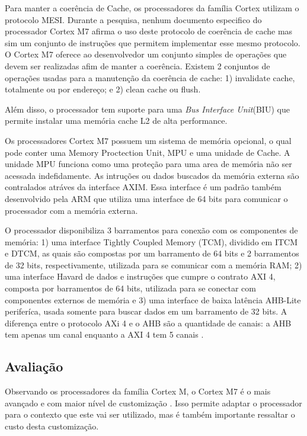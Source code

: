 \documentclass[10pt, a4paper]{article}
\begin{document}
Para manter a coerência de Cache, os processadores da família Cortex utilizam o protocolo MESI. Durante a pesquisa, nenhum documento especifico do processador Cortex M7 afirma o uso deste protocolo de coerência de cache mas sim um conjunto de instruções que permitem implementar esse mesmo protocolo. O Cortex M7 oferece ao desenvolvedor um conjunto simples de operações que devem ser realizadas afim de manter a coerência. Existem 2 conjuntos de operações usadas para a manutenção da coerência de cache: 1) invalidate cache, totalmente ou por endereço; e 2) clean cache ou flush.

Além disso, o processador tem suporte para uma \textit{Bus Interface Unit}(BIU) que permite instalar uma memória cache L2 de alta performance.

Os processadores Cortex M7 possuem um sistema de memória opcional, o qual pode conter uma Memory Proctection Unit, MPU e uma unidade de Cache. A unidade MPU funciona como uma proteção para uma area de memória não ser acessada indefidamente. As intruções ou dados buscados da memória externa são contralados atráves da interface AXIM. Essa interface é um padrão também desenvolvido pela ARM que utiliza uma interface de 64 bits para comunicar o processador com a memória externa.

O processador disponibiliza 3 barramentos para conexão com os componentes de memória: 1) uma interface Tightly Coupled Memory (TCM), dividido em ITCM e DTCM, as quais são compostas por um barramento de 64 bits e 2 barramentos de 32 bits, respectivamente, utilizada para se comunicar com a memória RAM; 2) uma interface Havard de dados e instruções que cumpre o contrato AXI 4, composta por barramentos de 64 bits, utilizada para se conectar com componentes externos de memória e 3) uma interface de baixa latência AHB-Lite periferíca, usada somente para buscar dados em um barramento de 32 bits. A diferença entre o protocolo AXi 4 e o AHB são a quantidade de canais: a AHB tem apenas um canal enquanto a AXI 4 tem 5 canais \autocite{computer-cortex-m7}.


\subsection{Avaliação}

Observando os processadores da família Cortex M, o Cortex M7 é o mais avançado e com maior nível de customização \autocite{arm-white-paper}. Isso permite adaptar o processador para o contexto que este vai ser utilizado, mas é também importante ressaltar o custo desta customização.
\end{document}
